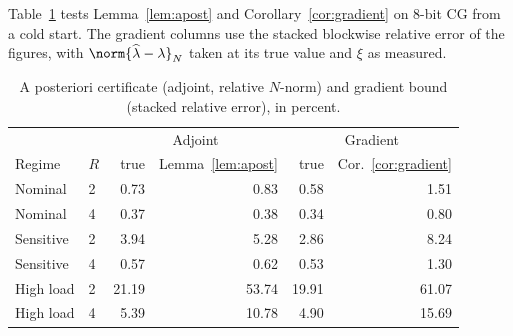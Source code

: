 Table~\ref{tab:apost} tests Lemma~\ref{lem:apost} and Corollary~\ref{cor:gradient} on 8-bit
CG from a cold start. The gradient columns use the stacked blockwise relative error of
the figures, with $\norm{\widehat\lambda-\lambda}_N$ taken at its true value and $\xi$ as
measured.
\begin{table}[h]
\caption{A posteriori certificate (adjoint, relative $N$-norm) and gradient bound
(stacked relative error), in percent.}\label{tab:apost}\centering\small
\setlength{\tabcolsep}{3.5pt}
\begin{tabular}{llrrrr}
\toprule
 & & \multicolumn{2}{c}{Adjoint} & \multicolumn{2}{c}{Gradient}\\
Regime & $R$ & true & Lemma~\ref{lem:apost} & true & Cor.~\ref{cor:gradient}\\
\midrule
Nominal & 2 & 0.73 & 0.83 & 0.58 & 1.51\\
Nominal & 4 & 0.37 & 0.38 & 0.34 & 0.80\\
Sensitive & 2 & 3.94 & 5.28 & 2.86 & 8.24\\
Sensitive & 4 & 0.57 & 0.62 & 0.53 & 1.30\\
High load & 2 & 21.19 & 53.74 & 19.91 & 61.07\\
High load & 4 & 5.39 & 10.78 & 4.90 & 15.69\\
\bottomrule
\end{tabular}
\end{table}

